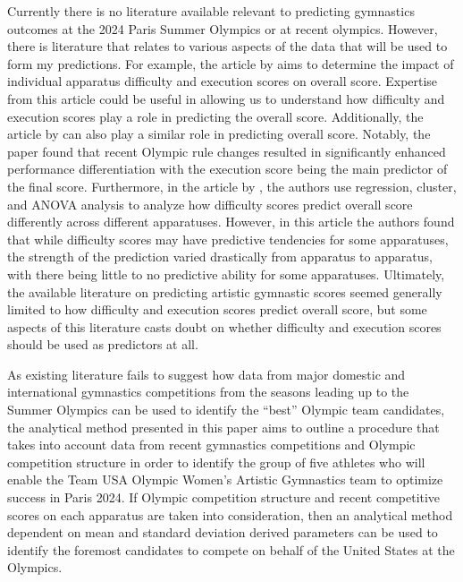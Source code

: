 \documentclass[12pt]{article}
\begin{document}
Currently there is no literature available relevant to predicting gymnastics outcomes at the 2024 
Paris Summer Olympics or at recent olympics. However, there is literature that relates to various aspects of 
the data that will be used to form my predictions. For example, the article by \citet{ScienceOfGymnastics2021} aims to determine the 
impact of individual apparatus difficulty and execution scores on overall score. 
Expertise from this article could be useful in allowing us to understand how difficulty and execution scores 
play a role in predicting the overall score. Additionally, the article by \citet{JonasRohleder2023} 
can also play a similar role in predicting overall 
score. Notably, the paper found that recent Olympic rule changes resulted in significantly enhanced performance 
differentiation with the execution score being the main predictor of the final score. 
Furthermore, in the article by \citet{ApparatusDifficulty2010}, the authors use regression, cluster, and ANOVA analysis to 
analyze how difficulty scores predict overall score differently across different apparatuses. However, in this 
article the authors found that while difficulty scores may have predictive tendencies for some apparatuses, 
the strength of the prediction varied drastically from apparatus to apparatus, with there being little to no 
predictive ability for some apparatuses. Ultimately, the available literature on predicting artistic 
gymnastic scores seemed generally limited to how difficulty and execution scores predict overall score, 
but some aspects of this literature casts doubt on whether difficulty and execution scores should be 
used as predictors at all.



As existing literature fails to suggest how data from major domestic and international gymnastics competitions 
from the seasons leading up to the Summer Olympics can be used to identify the ``best'' Olympic team candidates, 
the analytical method presented in this paper aims to outline a procedure that takes into account data from recent 
gymnastics competitions and Olympic competition structure in order to identify the group of five athletes who will 
enable the Team USA Olympic Women’s Artistic Gymnastics team to optimize success in Paris 2024. If Olympic 
competition structure and recent competitive scores on each apparatus are taken into consideration, then an 
analytical method dependent on mean and standard deviation derived parameters can be used to identify the foremost 
candidates to compete on behalf of the United States at the Olympics.
\end{document}
